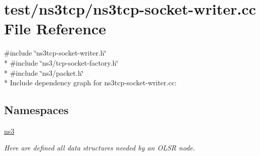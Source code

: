 \hypertarget{ns3tcp-socket-writer_8cc}{}\section{test/ns3tcp/ns3tcp-\/socket-\/writer.cc File Reference}
\label{ns3tcp-socket-writer_8cc}
{\ttfamily \#include \char`\"{}ns3tcp-\/socket-\/writer.\+h\char`\"{}}\\*
{\ttfamily \#include \char`\"{}ns3/tcp-\/socket-\/factory.\+h\char`\"{}}\\*
{\ttfamily \#include \char`\"{}ns3/packet.\+h\char`\"{}}\\*
Include dependency graph for ns3tcp-\/socket-\/writer.cc\+:
\subsection*{Namespaces}
\begin{DoxyCompactItemize}
\item 
 \hyperlink{namespacens3}{ns3}
\begin{DoxyCompactList}\small\item\em Here are defined all data structures needed by an O\+L\+SR node. \end{DoxyCompactList}\end{DoxyCompactItemize}
